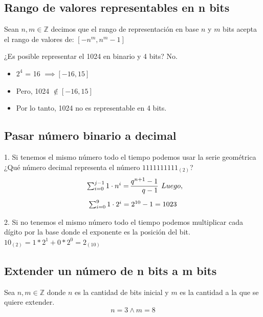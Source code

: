 \documentclass[10pt,a4paper]{article}
\begin{document}
\subsection*{Rango de valores representables en n bits}
Sean \( n, m \in \mathbb{Z} \) decimos que el rango de representación en base \(n\) y \(m\) bits acepta el rango de valores de: 
\(
\left[ -n^m, n^m - 1 \right]
\)

¿Es posible representar el 1024 en binario y 4 bits? No.
\begin{itemize}
    \item \(2^4\) = 16 \(\implies [-16, 15]\)
    \item Pero, 1024 \(\notin [-16, 15]\)
    \item Por lo tanto, 1024 no es representable en 4 bits.
\end{itemize} 

\subsection*{Pasar número binario a decimal}
1. Si tenemos el mismo número todo el tiempo podemos usar la serie geométrica \\

¿Qué número decimal representa el número \(1111111111_{(2)}\)?
\[
\begin{array}{l}
\sum_{i=0}^{j-1} 1 \cdot n^i = \begin{array}{@{} r @{}}
    q^{n+1} - 1 \\
    \hline
    q-1
 \end{array}
\end{array}
Luego, 
\]
\[
\begin{array}{l}
\sum_{i=0}^{9} 1 \cdot 2^i = \begin{array}{@{} r @{}}
    2^{10} - 1 = 1023 \\
 \end{array}
\end{array}
\]

2. Si no tenemos el mismo número todo el tiempo podemos multiplicar cada dígito por la base donde el exponente es la posición del bit. \\

\(10_{(2)} = 1 \ast 2^{1} + 0 \ast 2^{0} = 2_{(10)} \)

\subsection*{Extender un número de n bits a m bits}
Sea \( n, m \in \mathbb{Z} \) donde \(n\) es la cantidad de bits inicial y \(m\) es la cantidad a la que se quiere extender.
\[n = 3 \land m = 8\]
\end{document}
